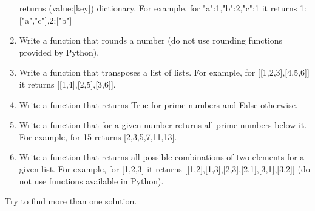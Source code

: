 \begin{enumerate}
returns (value:[key]) dictionary. For example, for {"a":1,"b":2,"c":1}
it returns {1:["a","c"],2:["b"]}
\item Write a function that rounds a number (do not use rounding functions
provided by Python).
\item Write a function that transposes a list of lists. For example,
for [[1,2,3],[4,5,6]] it returns [[1,4],[2,5],[3,6]].
\item Write a function that returns True for prime numbers and
False otherwise.
\item Write a function that for a given number 
returns all prime numbers below it. For example, for 15 returns
[2,3,5,7,11,13].
\item Write a function that returns all possible combinations
of two elements for a given list. For example, for [1,2,3] it
returns [[1,2],[1,3],[2,3],[2,1],[3,1],[3,2]] (do not use
functions available in Python).
\end{enumerate}

Try to find more than one solution. 








